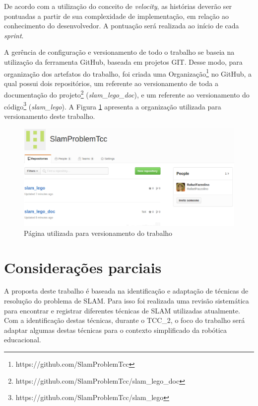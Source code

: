 		De acordo com a utilização do conceito de \textit{velocity}, as histórias deverão ser pontuadas a partir de sua complexidade de implementação, em relação ao conhecimento do desenvolvedor. A pontuação será realizada ao início de cada \textit{sprint}.

		A gerência de configuração e versionamento de todo o trabalho se baseia na utilização da ferramenta GitHub, baseada em projetos GIT. Desse modo, para organização dos artefatos do trabalho, foi criada uma Organização\footnote{https://github.com/SlamProblemTcc} no GitHub, a qual possui dois repositórios, um referente ao versionamento de toda a documentação do projeto\footnote{https://github.com/SlamProblemTcc/slam\_lego\_doc} (\textit{slam\_lego\_doc}), e um referente ao versionamento do código\footnote{https://github.com/SlamProblemTcc/slam\_lego} (\textit{slam\_lego}). A Figura \ref{img:github} apresenta a organização utilizada para versionamento deste trabalho.

		\begin{figure}[H]
			\centering
			\includegraphics[scale=0.44]{figuras/github.eps}
			\caption[Página utilizada para versionamento do trabalho]{Página utilizada para versionamento do trabalho}
			\label{img:github}
		\end{figure}
	

\section{Considerações parciais} %
\label{sec:considerações_parciais}

A proposta deste trabalho é baseada na identificação e adaptação de técnicas de resolução do problema de SLAM. Para isso foi realizada uma revisão sistemática para encontrar e registrar diferentes técnicas de SLAM utilizadas atualmente. Com a identificação destas técnicas, durante o TCC\_2, o foco do trabalho será adaptar algumas destas técnicas para o contexto simplificado da robótica educacional.

